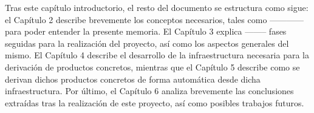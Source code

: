 

Tras este capítulo introductorio, el resto del documento se estructura como sigue: el
Capítulo 2 describe brevemente los conceptos necesarios, tales como ------------ para poder entender la presente memoria. El Capítulo 3 explica -------- fases seguidas para la realización del proyecto, así como
los aspectos generales del mismo. El Capítulo 4 describe el desarrollo de la infraestructura
necesaria para la derivación de productos concretos, mientras que el Capítulo 5 describe como
se derivan dichos productos concretos de forma automática desde dicha infraestructura.
Por último, el Capítulo 6 analiza brevemente las conclusiones extraídas tras la realización
de este proyecto, así como posibles trabajos futuros.